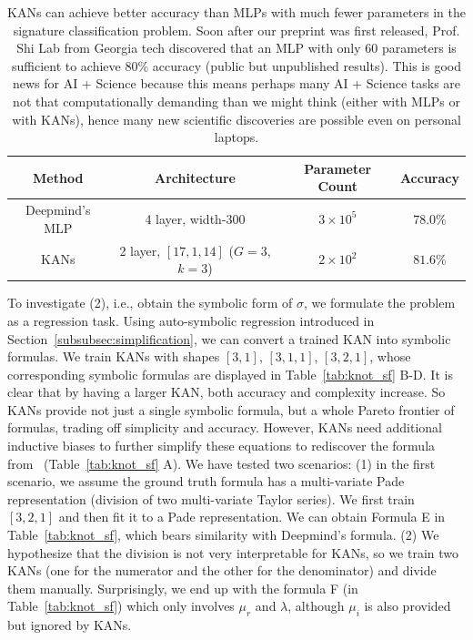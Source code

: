 \documentclass{article}
\numberwithin{equation}{section}
\numberwithin{figure}{section}
\begin{document}
\begin{table}[tbp]
    \centering
  \begin{tabular}{|c|c|c|c|}\hline
     Method & Architecture & Parameter Count & Accuracy \\\hline
    Deepmind's MLP & 4 layer, width-300  & $3\times 10^5$ &  $78.0\%$ 
     \\\hline
    KANs & 2 layer, $[17,1,14]$ ($G=3$, $k=3$) & $2\times 10^2$ &  $81.6\%$ \\\hline
    \end{tabular}
    \vspace{2mm}
    \caption{KANs can achieve better accuracy than MLPs with much fewer parameters in the signature classification problem. Soon after our preprint was first released, Prof. Shi Lab from Georgia tech discovered that an MLP with only 60 parameters is sufficient to achieve 80\% accuracy (public but unpublished results). This is good news for AI + Science because this means perhaps many AI + Science tasks are not that computationally demanding than we might think (either with MLPs or with KANs), hence many new scientific discoveries are possible even on personal laptops.}
    \label{tab:math-compare}
\end{table}

To investigate (2), i.e., obtain the symbolic form of $\sigma$, we formulate the problem as a regression task. Using auto-symbolic regression introduced in Section~\ref{subsubsec:simplification}, we can convert a trained KAN into symbolic formulas. We train KANs with shapes $[3,1]$, $[3,1,1]$, $[3,2,1]$, whose corresponding symbolic formulas are displayed in Table~\ref{tab:knot_sf} B-D. It is clear that by having a larger KAN, both accuracy and complexity increase. So KANs provide not just a single symbolic formula, but a whole Pareto frontier of formulas, trading off simplicity and accuracy. However, KANs need additional inductive biases to further simplify these equations to rediscover the formula from~\cite{davies2021advancing} (Table~\ref{tab:knot_sf} A). We have tested two scenarios: (1) in the first scenario, we assume the ground truth formula has a multi-variate Pade representation (division of two multi-variate Taylor series). We first train $[3,2,1]$ and then fit it to a Pade representation. We can obtain Formula E in Table~\ref{tab:knot_sf}, which bears similarity with Deepmind's formula. (2) We hypothesize that the division is not very interpretable for KANs, so we train two KANs (one for the numerator and the other for the denominator) and divide them manually. Surprisingly, we end up with the formula F (in Table~\ref{tab:knot_sf}) which only involves $\mu_r$ and $\lambda$, although $\mu_i$ is also provided but ignored by KANs. 
\end{document}
